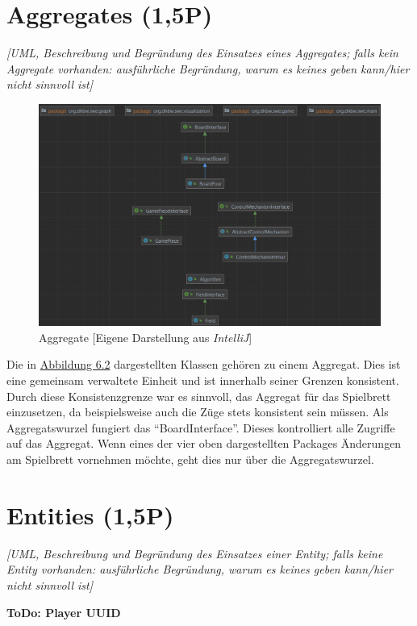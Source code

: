 \section{Aggregates (1,5P)}
\emph{[UML, Beschreibung und Begründung des Einsatzes eines Aggregates; falls kein Aggregate
vorhanden: ausführliche Begründung, warum es keines geben kann/hier nicht sinnvoll ist]}

\begin{figure}[htbp]
\centering
\centerline{\includegraphics[scale=.6]{aggregat}}
\caption{Aggregate [Eigene Darstellung aus \emph{IntelliJ}]}
\label{fig:aggregat}
\end{figure}

\noindent Die in \hyperref[fig:aggregat]{Abbildung 6.2} dargestellten Klassen gehören zu einem Aggregat. Dies ist eine gemeinsam verwaltete Einheit und ist innerhalb seiner Grenzen konsistent. Durch diese Konsistenzgrenze war es sinnvoll, das Aggregat für das Spielbrett einzusetzen, da beispielsweise auch die Züge stets konsistent sein müssen. Als Aggregatswurzel fungiert das \enquote{BoardInterface}. Dieses kontrolliert alle Zugriffe auf das Aggregat. Wenn eines der vier oben dargestellten Packages Änderungen am Spielbrett vornehmen möchte, geht dies nur über die Aggregatswurzel. 

\section{Entities (1,5P)}
\emph{[UML, Beschreibung und Begründung des Einsatzes einer Entity; falls keine Entity vorhanden:
ausführliche Begründung, warum es keines geben kann/hier nicht sinnvoll ist]}

\noindent \textbf{ToDo: Player UUID}

